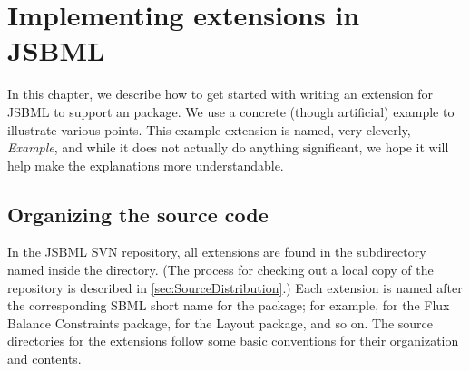 
\chapter{Implementing extensions in JSBML}
\label{sec:howToExtension}

In this chapter, we describe how to get started with writing an extension
for JSBML to support an \SBMLthree package.  We use a concrete (though
artificial) example to illustrate various points.  This example extension
is named, very cleverly, \emph{Example}, and while it does not actually do
anything significant, we hope it will help make the explanations more
understandable.


\section{Organizing the source code}
\label{sec:example-organization}

In the JSBML SVN repository, all extensions are found in the subdirectory
named  inside the  directory.  (The process
for checking out a local copy of the repository is described
in \vref{sec:SourceDistribution}.) Each extension is named after the
corresponding SBML short name for the \SBMLthree package; for example,
 for the Flux Balance Constraints package,  for the
Layout package, and so on.  The source directories for the extensions
follow some basic conventions for their organization and contents.

